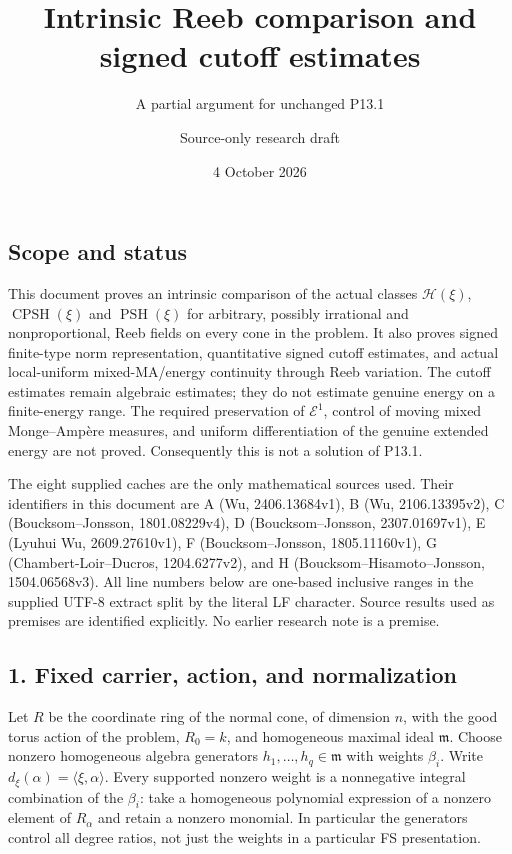 \documentclass[
  11pt,
]{article}
\title{Intrinsic Reeb comparison and signed cutoff estimates}
\subtitle{A partial argument for unchanged P13.1}
\author{Source-only research draft}
\date{4 October 2026}
\begin{document}
\maketitle

\subsection{Scope and status}\label{scope-and-status}

This document proves an intrinsic comparison of the actual classes
\(\mathcal H(\xi)\), \(\operatorname{CPSH}(\xi)\) and
\(\operatorname{PSH}(\xi)\) for arbitrary, possibly irrational and
nonproportional, Reeb fields on every cone in the problem. It also
proves signed finite-type norm representation, quantitative signed
cutoff estimates, and actual local-uniform mixed-MA/energy continuity
through Reeb variation. The cutoff estimates remain algebraic estimates;
they do not estimate genuine energy on a finite-energy range. The
required preservation of \(\mathcal E^1\), control of moving mixed
Monge--Ampère measures, and uniform differentiation of the genuine
extended energy are not proved. Consequently this is not a solution of
P13.1.

The eight supplied caches are the only mathematical sources used. Their
identifiers in this document are A (Wu, 2406.13684v1), B (Wu,
2106.13395v2), C (Boucksom--Jonsson, 1801.08229v4), D
(Boucksom--Jonsson, 2307.01697v1), E (Lyuhui Wu, 2609.27610v1), F
(Boucksom--Jonsson, 1805.11160v1), G (Chambert-Loir--Ducros,
1204.6277v2), and H (Boucksom--Hisamoto--Jonsson, 1504.06568v3). All
line numbers below are one-based inclusive ranges in the supplied UTF-8
extract split by the literal LF character. Source results used as
premises are identified explicitly. No earlier research note is a
premise.

\subsection{1. Fixed carrier, action, and
normalization}\label{fixed-carrier-action-and-normalization}

Let \(R\) be the coordinate ring of the normal cone, of dimension \(n\),
with the good torus action of the problem, \(R_0=k\), and homogeneous
maximal ideal \(\mathfrak m\). Choose nonzero homogeneous algebra
generators \(h_1,\ldots,h_q\in\mathfrak m\) with weights \(\beta_i\).
Write \(d_\xi(\alpha)=\langle\xi,\alpha\rangle\). Every supported
nonzero weight is a nonnegative integral combination of the \(\beta_i\):
take a homogeneous polynomial expression of a nonzero element of
\(R_\alpha\) and retain a nonzero monomial. In particular the generators
control all degree ratios, not just the weights in a particular FS
presentation.
\end{document}

